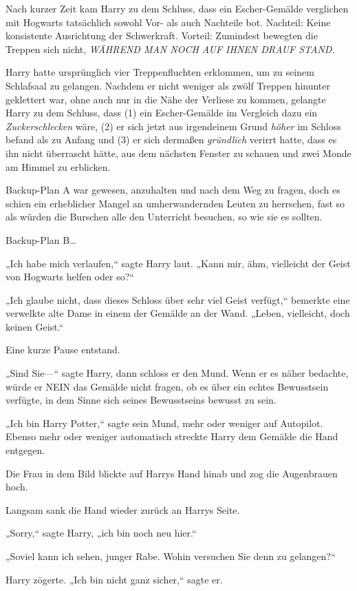 {Nach kurzer Zeit kam Harry zu dem Schluss, dass ein Escher-Gemälde verglichen mit Hogwarts tatsächlich sowohl Vor- als auch Nachteile bot. Nachteil: Keine konsistente Ausrichtung der Schwerkraft. Vorteil: Zumindest bewegten die Treppen sich nicht, \emph{WÄHREND MAN NOCH AUF IHNEN DRAUF STAND.}

Harry hatte ursprünglich vier Treppenfluchten erklommen, um zu seinem Schlafsaal zu gelangen. Nachdem er nicht weniger als zwölf Treppen hinunter geklettert war, ohne auch nur in die Nähe der Verliese zu kommen, gelangte Harry zu dem Schluss, dass (1) ein Escher-Gemälde im Vergleich dazu ein \emph{Zuckerschlecken} wäre, (2) er sich jetzt aus irgendeinem Grund \emph{höher} im Schloss befand als zu Anfang und (3) er sich dermaßen \emph{gründlich} verirrt hatte, dass es ihn nicht überrascht hätte, aus dem nächsten Fenster zu schauen und zwei Monde am Himmel zu erblicken.

Backup-Plan A war gewesen, anzuhalten und nach dem Weg zu fragen, doch es schien ein erheblicher Mangel an umherwandernden Leuten zu herrschen, fast so als würden die Burschen alle den Unterricht besuchen, so wie sie es sollten.

Backup-Plan B…

„Ich habe mich verlaufen,“ sagte Harry laut. „Kann mir, ähm, vielleicht der Geist von Hogwarts helfen oder so?“

„Ich glaube nicht, dass dieses Schloss über sehr viel Geist verfügt,“ bemerkte eine verwelkte alte Dame in einem der Gemälde an der Wand. „Leben, vielleicht, doch keinen Geist.“

Eine kurze Pause entstand.

„Sind Sie—“ sagte Harry, dann schloss er den Mund. Wenn er es näher bedachte, würde er NEIN das Gemälde nicht fragen, ob es über ein echtes Bewusstsein verfügte, in dem Sinne sich seines Bewusstseins bewusst zu sein.

„Ich bin Harry Potter,“ sagte sein Mund, mehr oder weniger auf Autopilot. Ebenso mehr oder weniger automatisch streckte Harry dem Gemälde die Hand entgegen.

Die Frau in dem Bild blickte auf Harrys Hand hinab und zog die Augenbrauen hoch.

Langsam sank die Hand wieder zurück an Harrys Seite.

„Sorry,“ sagte Harry, „ich bin noch neu hier.“

„Soviel kann ich sehen, junger Rabe. Wohin versuchen Sie denn zu gelangen?“

Harry zögerte. „Ich bin nicht ganz sicher,“ sagte er.

}

